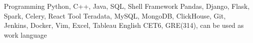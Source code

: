 \documentclass[11pt, a4paper, UTF8]{awesome-cv}
\begin{document}
\begin{cventries}
    
\end{cventries}



%
\begin{cvskills}
  \cvskill
    {Programming} %
    {Python, C++, Java, SQL, Shell} %
  \cvskill
    {Framework} %
    {Pandas, Django, Flask, Spark, Celery, React} %
  \cvskill
    {Tool} %
    {Teradata, MySQL, MongoDB, ClickHouse, Git, Jenkins, Docker, Vim, Excel, Tableau} %
  \cvskill
    {English} %
    {CET6, GRE(314), can be used as work language} %
\end{cvskills}



%
%
%
%
%


\end{document}
